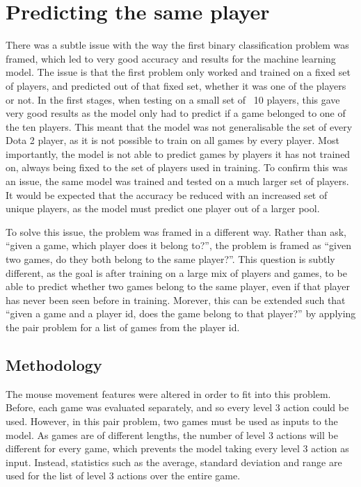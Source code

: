 \documentclass{../sty/SizheArticle}
\begin{document}
\section{Predicting the same player}
There was a subtle issue with the way the first binary classification problem was framed, which led to very good accuracy and results for the machine learning model. The issue is that the first problem only worked and trained on a fixed set of players, and predicted out of that fixed set, whether it was one of the players or not. In the first stages, when testing on a small set of ~10 players, this gave very good results as the model only had to predict if a game belonged to one of the ten players. This meant that the model was not generalisable the set of every Dota 2 player, as it is not possible to train on all games by every player. Most importantly, the model is not able to predict games by players it has not trained on, always being fixed to the set of players used in training. To confirm this was an issue, the same model was trained and tested on a much larger set of players. It would be expected that the accuracy be reduced with an increased set of unique players, as the model must predict one player out of a larger pool.

To solve this issue, the problem was framed in a different way. Rather than ask, ``given a game, which player does it belong to?'', the problem is framed as ``given two games, do they both belong to the same player?''. This question is subtly different, as the goal is after training on a large mix of players and games, to be able to predict whether two games belong to the same player, even if that player has never been seen before in training. Morever, this can be extended such that ``given a game and a player id, does the game belong to that player?'' by applying the pair problem for a list of games from the player id.

\subsection{Methodology}
The mouse movement features were altered in order to fit into this problem. Before, each game was evaluated separately, and so every level 3 action could be used. However, in this pair problem, two games must be used as inputs to the model. As games are of different lengths, the number of level 3 actions will be different for every game, which prevents the model taking every level 3 action as input. Instead, statistics such as the average, standard deviation and range are used for the list of level 3 actions over the entire game. 
\end{document}

